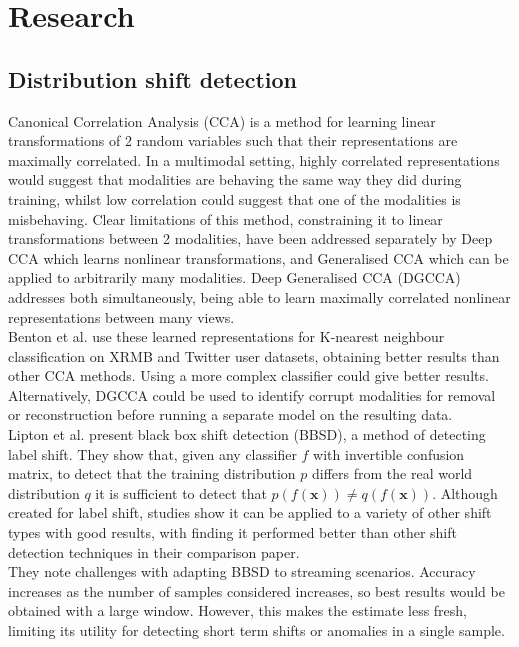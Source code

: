 \chapter{Research}

\section{Distribution shift detection}
Canonical Correlation Analysis (CCA) \cite{CCA} is a method for learning linear transformations of 2 random variables such that their representations are maximally correlated. In a multimodal setting, highly correlated representations would suggest that modalities are behaving the same way they did during training, whilst low correlation could suggest that one of the modalities is misbehaving. Clear limitations of this method, constraining it to linear transformations between 2 modalities, have been addressed separately by Deep CCA \cite{DCCA} which learns nonlinear transformations, and Generalised CCA \cite{GCCA} which can be applied to arbitrarily many modalities. Deep Generalised CCA (DGCCA) \cite{DGCCA} addresses both simultaneously, being able to learn maximally correlated nonlinear representations between many views.\\

Benton et al. \cite{DGCCA} use these learned representations for K-nearest neighbour classification on XRMB and Twitter user datasets, obtaining better results than other CCA methods. Using a more complex classifier could give better results. Alternatively, DGCCA could be used to identify corrupt modalities for removal or reconstruction before running a separate model on the resulting data.\\

Lipton et al. \cite{BBSD} present black box shift detection (BBSD), a method of detecting label shift. They show that, given any classifier $f$ with invertible confusion matrix, to detect that the training distribution $p$ differs from the real world distribution $q$ it is sufficient to detect that $p(f(\boldsymbol{x}))\neq q(f(\boldsymbol{x}))$. Although created for label shift, studies show it can be applied to a variety of other shift types with good results, with \cite{failingloudly} finding it performed better than other shift detection techniques in their comparison paper.\\

They note challenges with adapting BBSD to streaming scenarios. Accuracy increases as the number of samples considered increases, so best results would be obtained with a large window. However, this makes the estimate less fresh, limiting its utility for detecting short term shifts or anomalies in a single sample.\\


